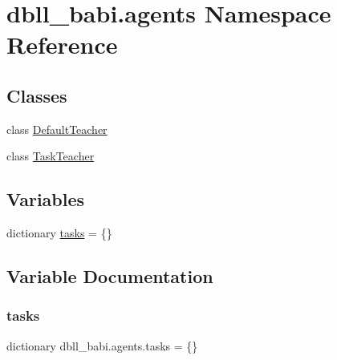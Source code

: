 \hypertarget{namespacedbll__babi_1_1agents}{}\section{dbll\+\_\+babi.\+agents Namespace Reference}
\label{namespacedbll__babi_1_1agents}
\subsection*{Classes}
\begin{DoxyCompactItemize}
\item 
class \hyperlink{classdbll__babi_1_1agents_1_1DefaultTeacher}{Default\+Teacher}
\item 
class \hyperlink{classdbll__babi_1_1agents_1_1TaskTeacher}{Task\+Teacher}
\end{DoxyCompactItemize}
\subsection*{Variables}
\begin{DoxyCompactItemize}
\item 
dictionary \hyperlink{namespacedbll__babi_1_1agents_a42038d6e3d34e9710c4d4b6234354f2f}{tasks} = \{\}
\end{DoxyCompactItemize}


\subsection{Variable Documentation}
\mbox{\label{namespacedbll__babi_1_1agents_a42038d6e3d34e9710c4d4b6234354f2f}} 
\subsubsection{\texorpdfstring{tasks}{tasks}}
{\footnotesize\ttfamily dictionary dbll\+\_\+babi.\+agents.\+tasks = \{\}}

